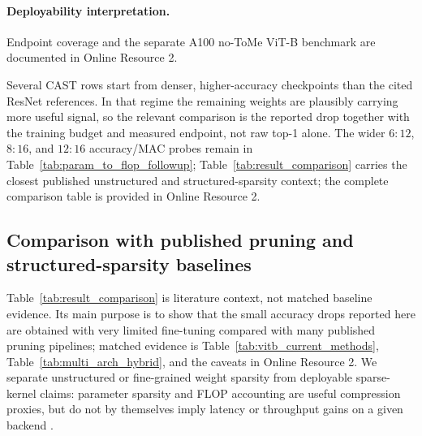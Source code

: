 \documentclass[11pt]{article}
\theoremstyle{plain}
\theoremstyle{definition}
\theoremstyle{remark}
\newcommand{\1}{\mathbf{1}}
\begin{document}
\paragraph{Deployability interpretation.}
Endpoint coverage and the separate A100 no-ToMe ViT-B benchmark are documented in Online Resource 2.

Several CAST rows start from denser, higher-accuracy checkpoints than the cited ResNet references. In that regime the remaining weights are plausibly carrying more useful signal, so the relevant comparison is the reported drop together with the training budget and measured endpoint, not raw top-1 alone. The wider \(6{:}12\), \(8{:}16\), and \(12{:}16\) accuracy/MAC probes remain in Table~\ref{tab:param_to_flop_followup}; Table~\ref{tab:result_comparison} carries the closest published unstructured and structured-sparsity context; the complete comparison table is provided in Online Resource 2.



\subsection{Comparison with published pruning and structured-sparsity baselines}
\label{subsec:result_comparison}

Table~\ref{tab:result_comparison} is literature context, not matched baseline evidence. Its main purpose is to show that the small accuracy drops reported here are obtained with very limited fine-tuning compared with many published pruning pipelines; matched evidence is Table~\ref{tab:vitb_current_methods}, Table~\ref{tab:multi_arch_hybrid}, and the caveats in Online Resource 2. We separate unstructured or fine-grained weight sparsity from deployable sparse-kernel claims: parameter sparsity and FLOP accounting are useful compression proxies, but do not by themselves imply latency or throughput gains on a given backend \cite{gale2019state,blalock2020state,hoefler2021sparsity}.
\end{document}
